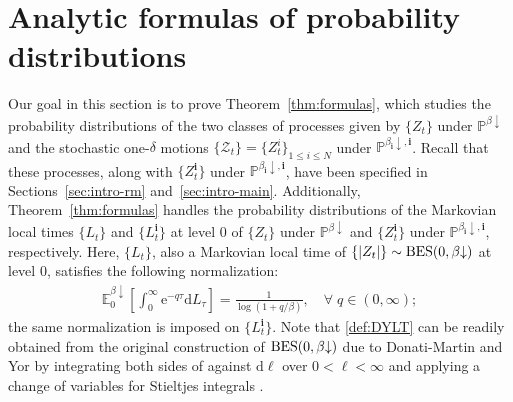 \documentclass[12pt, twoside]{article}
\numberwithin{figure}{section}
\newcommand{\BES}{{\rm BES}}
\newcommand{\e}{{\mathrm e}}
\newcommand{\1}{\mathds 1}
\newcommand{\da}{{\downarrow}}
\newcommand{\ms}{\mathscr}
\renewcommand{\P}{{\mathbb P}}
\newcommand{\E}{{\mathbb E}}
\renewcommand{\d}{{\mathrm d}}
\newcommand{\2}{{\mathbf 1}}
\newcommand{\bi}{\mathbf i}
\begin{document}
\section{Analytic formulas of probability distributions}\label{sec:MARG}
Our goal in this section is to prove Theorem~\ref{thm:formulas}, which studies the probability distributions of
the two classes of processes given by $\{Z_t\}$ under $\P^{\beta\da}$
 and the stochastic one-$\delta$ motions $\{\ms Z_t\}=\{ Z^i_t\}_{1\leq i\leq N}$ under $\P^{\beta_\bi\da,\bi}$. Recall that these processes, along with $\{Z^\bi_t\}$ under $\P^{\beta_\bi\da,\bi}$, have been specified in Sections~\ref{sec:intro-rm} and~\ref{sec:intro-main}. Additionally, Theorem~\ref{thm:formulas} handles the probability distributions of the Markovian local times $\{L_t\}$ and $\{L_t^\bi\}$ at level $0$  of $\{Z_t\}$ under $\P^{\beta\da}$ and $\{Z^\bi_t\}$ under $\P^{\beta_\bi\da,\bi}$, respectively. Here, $\{L_t\}$, also a Markovian local time of $\{|Z_t|\}\sim \BES(0,\beta\da)$ at level $0$, satisfies the following normalization:
\begin{align}\label{def:DYLT}
\E^{\beta\da}_0\left[\int_0^\infty\e^{-q\tau} \d  L_\tau\right]=\frac{1}{\log (1+q/\beta)},\quad \forall\;q\in (0,\infty);
\end{align}
the same normalization is imposed on $\{L^\bi_t\}$. 
Note that \eqref{def:DYLT} can be readily obtained from the original construction of $\BES(0,\beta\da)$ due to Donati-Martin and Yor \cite{DY:Krein} by integrating both sides of \cite[(2.10), p.884]{DY:Krein} against $\d \ell$ over $0<\ell<\infty$ and applying a change of variables for Stieltjes integrals \cite[(4.9) Proposition, p.8]{RY}. 
\end{document}
